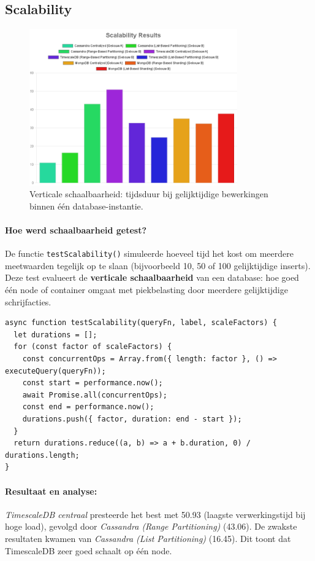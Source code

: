 \subsection{Scalability}

\begin{figure}[H]
	\centering
	\includegraphics[width=0.8\textwidth]{charts/Scalability.png}
	\caption{Verticale schaalbaarheid: tijdsduur bij gelijktijdige bewerkingen binnen één database-instantie.}
	\label{fig:scalability-comparison}
\end{figure}

\paragraph{Hoe werd schaalbaarheid getest?}
De functie \texttt{testScalability()} simuleerde hoeveel tijd het kost om meerdere meetwaarden tegelijk op te slaan (bijvoorbeeld 10, 50 of 100 gelijktijdige inserts). Deze test evalueert de \textbf{verticale schaalbaarheid} van een database: hoe goed één node of container omgaat met piekbelasting door meerdere gelijktijdige schrijfacties.

\begin{verbatim}
async function testScalability(queryFn, label, scaleFactors) {
  let durations = [];
  for (const factor of scaleFactors) {
    const concurrentOps = Array.from({ length: factor }, () => executeQuery(queryFn));
    const start = performance.now();
    await Promise.all(concurrentOps);
    const end = performance.now();
    durations.push({ factor, duration: end - start });
  }
  return durations.reduce((a, b) => a + b.duration, 0) / durations.length;
}
\end{verbatim}

\paragraph{Resultaat en analyse:}
\textit{TimescaleDB centraal} presteerde het best met 50.93 (laagste verwerkingstijd bij hoge load), gevolgd door \textit{Cassandra (Range Partitioning)} (43.06). De zwakste resultaten kwamen van \textit{Cassandra (List Partitioning)} (16.45). Dit toont dat TimescaleDB zeer goed schaalt op één node.

